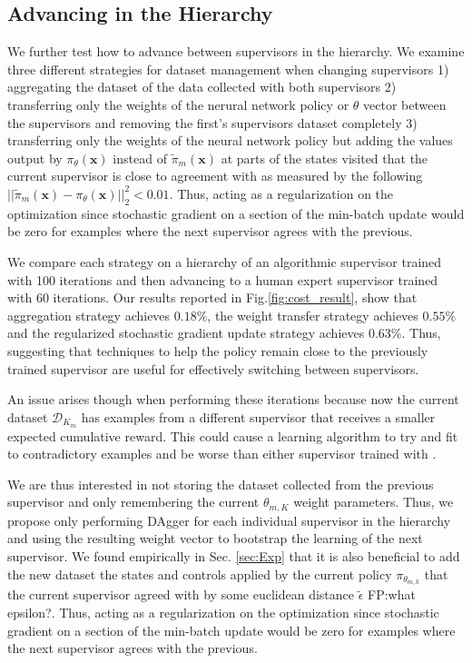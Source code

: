 \documentclass[10pt, conference]{ieeeconf}      %
\newcommand{\bx}{\mathbf{x}}
\begin{document}
\subsection{Advancing in the Hierarchy}
We further test how to advance between supervisors in the hierarchy. We examine three different strategies for dataset management when changing supervisors 1) aggregating the dataset of the data collected with both supervisors 2) transferring only the weights of the nerural network policy or $\theta$ vector between the supervisors and removing the first's supervisors dataset completely 3) transferring only the weights of the neural network policy but adding the values output by $\pi_\theta(\bx)$  instead of $\tilde{\pi}_m(\bx)$ at parts of the states visited that the current supervisor is close to agreement with as measured by the following $||\tilde{\pi}_m(\bx) - \pi_\theta(\bx)||^2_2 < 0.01$. Thus, acting as a regularization on the optimization since stochastic gradient on a section of the min-batch update would be zero for examples where the next supervisor agrees with the previous. 

We compare each strategy on a hierarchy of an algorithmic supervisor trained with 100 iterations and then advancing to a human expert supervisor trained with 60 iterations.  Our results reported in Fig.\ref{fig:cost_result}, show that aggregation strategy achieves $0.18\%$, the weight transfer strategy achieves $0.55\%$ and the regularized stochastic gradient update strategy achieves $0.63\%$. Thus, suggesting that techniques to help the policy remain close to the previously trained supervisor are useful for effectively switching between supervisors.   

An issue arises though when performing these iterations because now the current dataset $\mathcal{D}_{K_m}$ has examples from a different supervisor that receives a smaller expected cumulative reward. This could cause a learning algorithm to try and fit to contradictory examples  and be worse than either supervisor trained with \cite{scholkopf2002learning}.

We are thus interested in not storing the dataset collected from the previous supervisor and only remembering the
current $\theta_{m,K}$ weight parameters. Thus, we propose only performing DAgger for each individual supervisor in the
hierarchy and using the resulting weight vector to bootstrap the learning of the next supervisor. We found empirically
in Sec. \ref{sec:Exp} that it is also beneficial to add the new dataset the states and controls applied by the current
policy $\pi_{\theta_{m,k}}$ that the current supervisor agreed with by some euclidean distance
$\tilde{\epsilon}$ {\color{blue}FP:what epsilon?}. Thus, acting as a regularization on the optimization since stochastic gradient on a section of the min-batch update would be zero for examples where the next supervisor agrees with the previous. 
\end{document}
